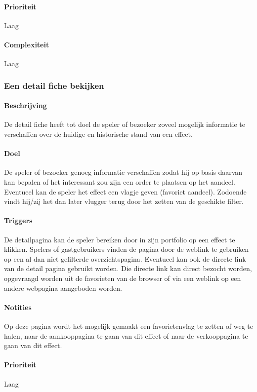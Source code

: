 \paragraph{Prioriteit}Laag
\paragraph{Complexiteit}Laag

\subsubsection{Een detail fiche bekijken}
\paragraph{Beschrijving} De detail fiche heeft tot doel de speler of bezoeker zoveel mogelijk informatie te verschaffen over de huidige en historische stand van een effect.
\paragraph{Doel} De speler of bezoeker genoeg informatie verschaffen zodat hij op basis daarvan kan bepalen of het interessant zou zijn een order te plaatsen op het aandeel. Eventueel kan de speler het effect een vlagje geven (favoriet aandeel). Zodoende vindt hij/zij het dan later vlugger terug door het zetten van de geschikte filter.
\paragraph{Triggers} De detailpagina kan de speler bereiken door in zijn portfolio op een effect te klikken. Spelers of gastgebruikers vinden de pagina door de weblink te gebruiken op een al dan niet gefilterde overzichtspagina. Eventueel kan ook de directe link van de detail pagina gebruikt worden. Die directe link kan direct bezocht worden, opgevraagd worden uit de favorieten van de browser of via een weblink op een andere webpagina aangeboden worden.
\paragraph{Notities} Op deze pagina wordt het mogelijk gemaakt een favorietenvlag te zetten of weg te halen, naar de aankooppagina te gaan van dit effect of naar de verkooppagina te gaan van dit effect.
\paragraph{Prioriteit}Laag
